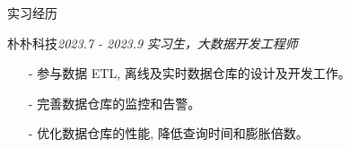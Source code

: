 \documentclass{resume} %
\begin{document}
\begin{rSection}{实习经历}

\begin{rSubsection}{朴朴科技}{\em 2023.7 - 2023.9}
    {\textit{实习生，大数据开发工程师}}
    {\textit{}}
    \item[]
    \begin{itemize}
        \setlength\itemsep{-0.5em}
        \item[-] 参与数据 ETL, 离线及实时数据仓库的设计及开发工作。
        \item[-] 完善数据仓库的监控和告警。
        \item[-] 优化数据仓库的性能, 降低查询时间和膨胀倍数。
    \end{itemize}
\end{rSubsection}

\end{rSection}

\end{document}
